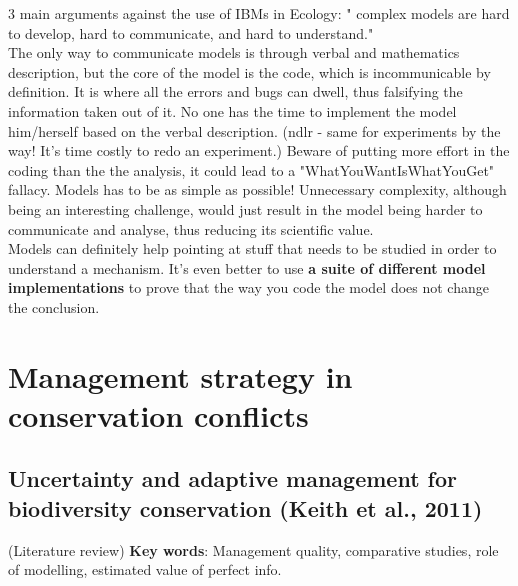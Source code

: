 \documentclass[12pt]{article}
\begin{document}
3 main arguments against the use of IBMs in Ecology: " complex  models  are  hard  to develop,   hard to   communicate,   and   hard   to understand."\\
The only way to communicate models is through verbal and mathematics description, but the core of the model is the code, which is incommunicable by definition. It is where all the errors and bugs can dwell, thus falsifying the information taken out of it. No one has the time to implement the model him/herself based on the verbal description. (ndlr - same for experiments by the way! It's time costly to redo an experiment.) Beware of putting more effort in the coding than the the analysis, it could lead to a "WhatYouWantIsWhatYouGet" fallacy. Models has to be as simple as possible! Unnecessary complexity, although being an interesting challenge, would just result in the model being harder to communicate and analyse, thus reducing its scientific value.\\
Models can definitely help pointing at stuff that needs to be studied in order to understand a mechanism. It's even better to use \textbf{a suite of different model implementations} to prove that the way you code the model does not change the conclusion.

\section{Management strategy in conservation conflicts}

\subsection{Uncertainty and adaptive management for biodiversity conservation (Keith et al., 2011)}

(Literature review)
\textbf{Key words}: Management quality, comparative studies, role of modelling, estimated value of perfect info.
\end{document}
